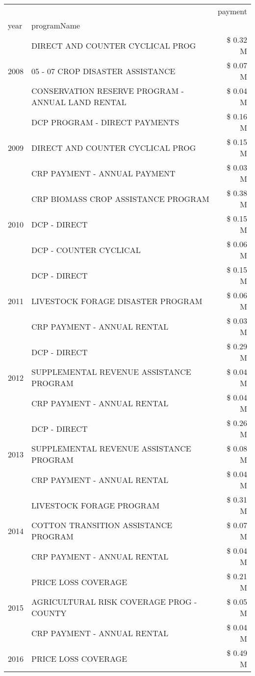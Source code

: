\begin{tabular}{llr}
\toprule
 &  & payment \\
year & programName &  \\
\midrule
\multirow[t]{3}{*}{2008} & DIRECT AND COUNTER CYCLICAL PROG & \$ 0.32 M \\
 & 05 - 07 CROP DISASTER ASSISTANCE & \$ 0.07 M \\
 & CONSERVATION RESERVE PROGRAM - ANNUAL LAND RENTAL & \$ 0.04 M \\
\cline{1-3}
\multirow[t]{3}{*}{2009} & DCP PROGRAM - DIRECT PAYMENTS & \$ 0.16 M \\
 & DIRECT AND COUNTER CYCLICAL PROG & \$ 0.15 M \\
 & CRP PAYMENT - ANNUAL PAYMENT & \$ 0.03 M \\
\cline{1-3}
\multirow[t]{3}{*}{2010} & CRP BIOMASS CROP ASSISTANCE PROGRAM & \$ 0.38 M \\
 & DCP - DIRECT & \$ 0.15 M \\
 & DCP - COUNTER CYCLICAL & \$ 0.06 M \\
\cline{1-3}
\multirow[t]{3}{*}{2011} & DCP - DIRECT & \$ 0.15 M \\
 & LIVESTOCK FORAGE DISASTER PROGRAM & \$ 0.06 M \\
 & CRP PAYMENT - ANNUAL RENTAL & \$ 0.03 M \\
\cline{1-3}
\multirow[t]{3}{*}{2012} & DCP - DIRECT & \$ 0.29 M \\
 & SUPPLEMENTAL REVENUE ASSISTANCE PROGRAM & \$ 0.04 M \\
 & CRP PAYMENT - ANNUAL RENTAL & \$ 0.04 M \\
\cline{1-3}
\multirow[t]{3}{*}{2013} & DCP - DIRECT & \$ 0.26 M \\
 & SUPPLEMENTAL REVENUE ASSISTANCE PROGRAM & \$ 0.08 M \\
 & CRP PAYMENT - ANNUAL RENTAL & \$ 0.04 M \\
\cline{1-3}
\multirow[t]{3}{*}{2014} & LIVESTOCK FORAGE PROGRAM & \$ 0.31 M \\
 & COTTON TRANSITION ASSISTANCE PROGRAM & \$ 0.07 M \\
 & CRP PAYMENT - ANNUAL RENTAL & \$ 0.04 M \\
\cline{1-3}
\multirow[t]{3}{*}{2015} & PRICE LOSS COVERAGE & \$ 0.21 M \\
 & AGRICULTURAL RISK COVERAGE PROG - COUNTY & \$ 0.05 M \\
 & CRP PAYMENT - ANNUAL RENTAL & \$ 0.04 M \\
\cline{1-3}
\multirow[t]{3}{*}{2016} & PRICE LOSS COVERAGE & \$ 0.49 M \\

\end{tabular}
